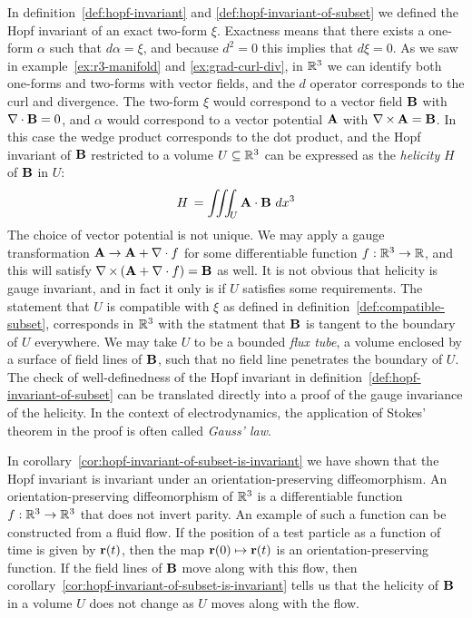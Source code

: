 In definition~\ref{def:hopf-invariant} and \ref{def:hopf-invariant-of-subset}
we defined the Hopf invariant of an exact two-form $\xi$.
Exactness means that there exists a one-form $\alpha$ such that $d\alpha = \xi$,
and because $d^2 = 0$ this implies that $d\xi = 0$.
As we saw in example~\ref{ex:r3-manifold} and \ref{ex:grad-curl-div},
in $\R^3$ we can identify both one-forms and two-forms with vector fields,
and the $d$ operator corresponds to the curl and divergence.
The two-form $\xi$ would correspond to a vector field $\Bf$ with $\nabla \cdot \Bf = 0$,
and $\alpha$ would correspond to a vector potential $\Af$ with $\nabla \times \Af = \Bf$.
In this case the wedge product corresponds to the dot product,
and the Hopf invariant of $\Bf$ restricted to a volume $U \subseteq \R^3$
can be expressed as the \emph{helicity} $H$ of $\Bf$ in $U$:
\[ H \, = \iiint_{\!U} \Af \cdot \Bf \ dx^3 \]
The choice of vector potential is not unique.
We may apply a gauge transformation $\Af \to \Af + \nabla \cdot f$
for some differentiable function $f : \R^3 \to \R$,
and this will satisfy $\nabla \times {(\Af + \nabla \cdot f)} = \Bf$ as well.
It is not obvious that helicity is gauge invariant,
and in fact it only is if $U$ satisfies some requirements.
The statement that $U$ is compatible with $\xi$
as defined in definition~\ref{def:compatible-subset},
corresponds in $\R^3$ with the statment that $\Bf$ is tangent to the boundary of $U$ everywhere.
We may take $U$ to be a bounded \emph{flux tube},
a volume enclosed by a surface of field lines of $\Bf$,
such that no field line penetrates the boundary of $U$.
The check of well-definedness of the Hopf invariant in definition~\ref{def:hopf-invariant-of-subset}
can be translated directly into a proof of the gauge invariance of the helicity.
In the context of electrodynamics,
the application of Stokes’ theorem in the proof
is often called \emph{Gauss’ law}.

In corollary~\ref{cor:hopf-invariant-of-subset-is-invariant}
we have shown that the Hopf invariant
is invariant under an orientation-preserving diffeomorphism.
An orientation-preserving diffeomorphism of $\R^3$
is a differentiable function $f : \R^3 \to \R^3$ that does not invert parity.
An example of such a function
can be constructed from a fluid flow.
If the position of a test particle as a function of time is given by $\rf(t)$,
then the map $\rf(0) \mapsto \rf(t)$ is an orientation-preserving function.
If the field lines of $\Bf$ move along with this flow,
then corollary~\ref{cor:hopf-invariant-of-subset-is-invariant}
tells us that the helicity of $\Bf$ in a volume $U$
does not change as $U$ moves along with the flow.
